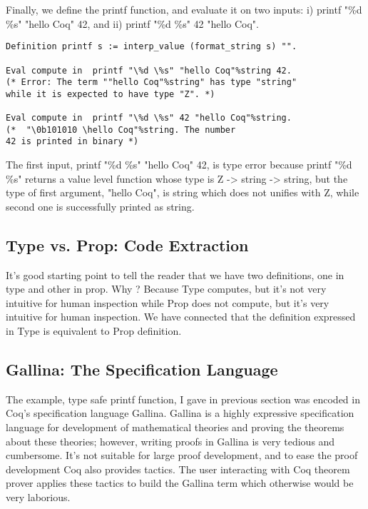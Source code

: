 \noindent
Finally, we define the printf function, and evaluate it on two inputs: 
i)  printf "\%d \%s" "hello Coq" 42, and ii)  printf "\%d \%s" 42 "hello Coq".

\begin{verbatim}
Definition printf s := interp_value (format_string s) "".           

Eval compute in  printf "\%d \%s" "hello Coq"%string 42.
(* Error: The term ""hello Coq"%string" has type "string" 
while it is expected to have type "Z". *)

Eval compute in  printf "\%d \%s" 42 "hello Coq"%string. 
(*  "\0b101010 \hello Coq"%string. The number 
42 is printed in binary *)                            
\end{verbatim}
The first input, printf "\%d \%s" "hello Coq" 42, is type error because 
printf "\%d \%s" returns a value level function whose  type is Z -> string -> string, but 
the type of first argument, "hello Coq", is string which does not unifies with Z,
while second one is successfully printed as string. 

  
  
\subsection{Type vs. Prop: Code Extraction}
\label{sec:typeprop}
  It's good starting point to tell the reader that we have two definitions, 
  one in type and other in prop. Why ? Because Type computes, but it's
  not very intuitive for human inspection while Prop does not compute, 
  but it's very intuitive for human inspection. We have connected that 
  the definition expressed in Type is equivalent to Prop definition. 
 
 \subsection{Gallina: The Specification Language}
 \label{sec:gallina}
  The example, type safe printf function, I gave in previous 
  section was encoded in Coq's specification language Gallina. 
  Gallina is a highly expressive specification 
  language for development of mathematical theories and proving the    
  theorems about these  theories; however, writing proofs in Gallina
  is very tedious and cumbersome. It's not suitable for large proof 
  development, and to ease the proof development Coq also provides 
  tactics.  The user interacting with Coq theorem prover applies these 
  tactics to build the  Gallina term  which otherwise would  
  be very laborious.
  
